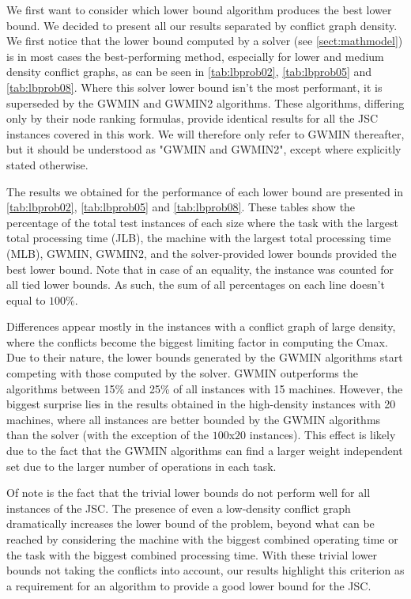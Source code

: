 \documentclass{mimosis}
\begin{document}
We first want to consider which lower bound algorithm produces the best lower bound. We decided to present all our results separated by conflict graph density. We first notice that the lower bound computed by a solver (see \cref{sect:mathmodel}) is in most cases the best-performing method, especially for lower and medium density conflict graphs, as can be seen in \cref{tab:lbprob02}, \cref{tab:lbprob05} and \cref{tab:lbprob08}. Where this solver lower bound isn't the most performant, it is superseded by the GWMIN and GWMIN2 algorithms. These algorithms, differing only by their node ranking formulas, provide identical results for all the JSC instances covered in this work. We will therefore only refer to GWMIN thereafter, but it should be understood as "GWMIN and GWMIN2", except where explicitly stated otherwise.

The results we obtained for the performance of each lower bound are presented in \cref{tab:lbprob02}, \cref{tab:lbprob05} and \cref{tab:lbprob08}. These tables show the percentage of the total test instances of each size where the task with the largest total processing time (JLB), the machine with the largest total processing time (MLB), GWMIN, GWMIN2, and the solver-provided lower bounds provided the best lower bound. Note that in case of an equality, the instance was counted for all tied lower bounds. As such, the sum of all percentages on each line doesn't equal to \(100\%\).

Differences appear mostly in the instances with a conflict graph of large density, where the conflicts become the biggest limiting factor in computing the Cmax. Due to their nature, the lower bounds generated by the GWMIN algorithms start competing with those computed by the solver. GWMIN outperforms the algorithms between 15\% and 25\% of all instances with 15 machines. However, the biggest surprise lies in the results obtained in the high-density instances with 20 machines, where all instances are better bounded by the GWMIN algorithms than the solver (with the exception of the \(100\)x\(20\) instances). This effect is likely due to the fact that the GWMIN algorithms can find a larger weight independent set due to the larger number of operations in each task.

Of note is the fact that the trivial lower bounds do not perform well for all instances of the JSC. The presence of even a low-density conflict graph dramatically increases the lower bound of the problem, beyond what can be reached by considering the machine with the biggest combined operating time or the task with the biggest combined processing time. With these trivial lower bounds not taking the conflicts into account, our results highlight this criterion as a requirement for an algorithm to provide a good lower bound for the JSC.
\end{document}
